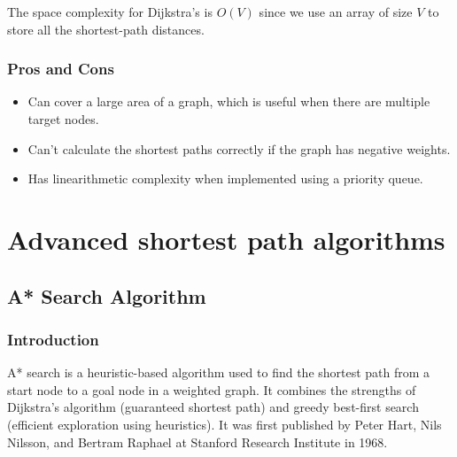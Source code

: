 			The space complexity for Dijkstra's is $O(V)$ since we use an array of size $V$ to store all the shortest-path distances.
		\subsubsection{Pros and Cons}
		\begin{itemize}
			\item Can cover a large area of a graph, which is useful when there are multiple target nodes.
			\item Can't calculate the shortest paths correctly if the graph has negative weights.
			\item Has linearithmetic complexity when implemented using a priority queue.
		\end{itemize}

\section{Advanced shortest path algorithms}
	\subsection{A* Search Algorithm}
		\subsubsection{Introduction}
			A* search is a heuristic-based algorithm used to find the shortest path from a start node to a goal node in a weighted graph. It combines the strengths of Dijkstra's algorithm (guaranteed shortest path) and greedy best-first search (efficient exploration using heuristics). It was first published by Peter Hart, Nils Nilsson, and Bertram Raphael at Stanford Research Institute in 1968.
